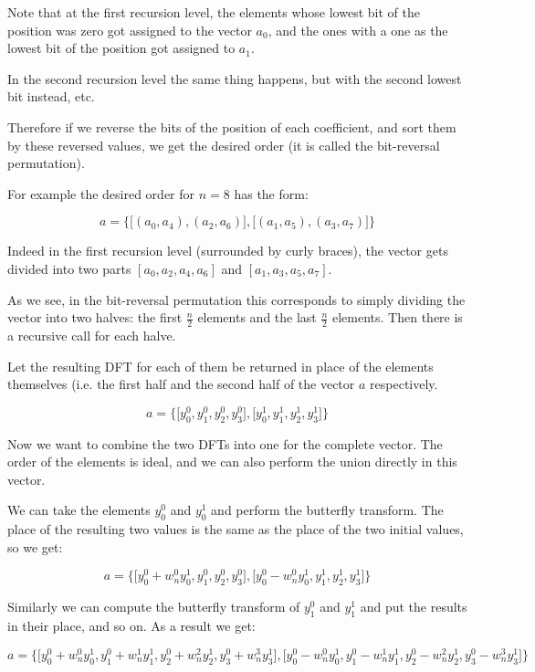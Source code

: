 \documentclass[12pt]{article}
\theoremstyle{definition}
\begin{document}
Note that at the first recursion level, the elements whose lowest bit of the position was zero got assigned to the vector $a_0$, and the ones with a one as the lowest bit of the position got assigned to $a_1$.

In the second recursion level the same thing happens, but with the second lowest bit instead, etc.

Therefore if we reverse the bits of the position of each coefficient, and sort them by these reversed values, we get the desired order (it is called the bit-reversal permutation).

For example the desired order for $n = 8$ has the form:

$$a = \bigg\{ \Big[ (a_0, a_4), (a_2, a_6) \Big], \Big[ (a_1, a_5), (a_3, a_7) \Big] \bigg\}$$

Indeed in the first recursion level (surrounded by curly braces), the vector gets divided into two parts $[a_0, a_2, a_4, a_6]$ and $[a_1, a_3, a_5, a_7]$.

As we see, in the bit-reversal permutation this corresponds to simply dividing the vector into two halves: the first $\frac{n}{2}$ elements and the last $\frac{n}{2}$ elements.
Then there is a recursive call for each halve.

Let the resulting DFT for each of them be returned in place of the elements themselves (i.e. the first half and the second half of the vector $a$ respectively.

$$a = \bigg\{ \Big[y_0^0, y_1^0, y_2^0, y_3^0\Big], \Big[y_0^1, y_1^1, y_2^1, y_3^1 \Big] \bigg\}$$

Now we want to combine the two DFTs into one for the complete vector.
The order of the elements is ideal, and we can also perform the union directly in this vector.

We can take the elements $y_0^0$ and $y_0^1$ and perform the butterfly transform.
The place of the resulting two values is the same as the place of the two initial values, so we get:

$$a = \bigg\{ \Big[y_0^0 + w_n^0 y_0^1, y_1^0, y_2^0, y_3^0\Big], \Big[y_0^0 - w_n^0 y_0^1, y_1^1, y_2^1, y_3^1\Big] \bigg\}$$


Similarly we can compute the butterfly transform of $y_1^0$ and $y_1^1$ and put the results in their place, and so on.
As a result we get:

$$a = \bigg\{ \Big[y_0^0 + w_n^0 y_0^1, y_1^0 + w_n^1 y_1^1, y_2^0 + w_n^2 y_2^1, y_3^0 + w_n^3 y_3^1\Big], \Big[y_0^0 - w_n^0 y_0^1, y_1^0 - w_n^1 y_1^1, y_2^0 - w_n^2 y_2^1, y_3^0 - w_n^3 y_3^1\Big] \bigg\}$$
\end{document}
